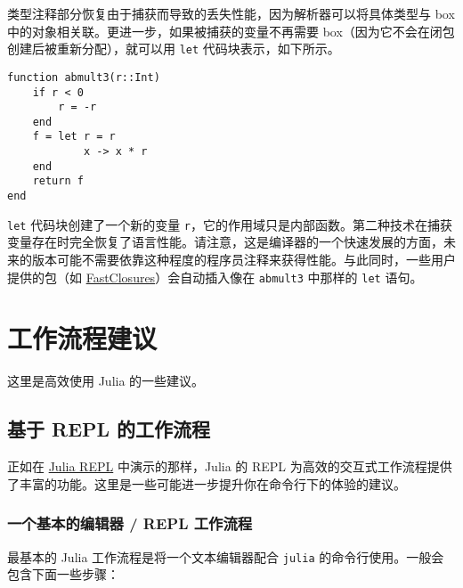 类型注释部分恢复由于捕获而导致的丢失性能，因为解析器可以将具体类型与 box 中的对象相关联。更进一步，如果被捕获的变量不再需要 box（因为它不会在闭包创建后被重新分配），就可以用 \texttt{let} 代码块表示，如下所示。




\begin{verbatim}
function abmult3(r::Int)
    if r < 0
        r = -r
    end
    f = let r = r
            x -> x * r
    end
    return f
end
\end{verbatim}



\texttt{let} 代码块创建了一个新的变量 \texttt{r}，它的作用域只是内部函数。第二种技术在捕获变量存在时完全恢复了语言性能。请注意，这是编译器的一个快速发展的方面，未来的版本可能不需要依靠这种程度的程序员注释来获得性能。与此同时，一些用户提供的包（如 \href{https://github.com/c42f/FastClosures.jl}{FastClosures}）会自动插入像在 \texttt{abmult3} 中那样的 \texttt{let} 语句。



\hypertarget{14117620934191882930}{}


\chapter{工作流程建议}



这里是高效使用 Julia 的一些建议。



\hypertarget{1742408234615272902}{}


\section{基于 REPL 的工作流程}



正如在 \hyperlink{10670790884919535588}{Julia REPL} 中演示的那样，Julia 的 REPL 为高效的交互式工作流程提供了丰富的功能。这里是一些可能进一步提升你在命令行下的体验的建议。



\hypertarget{11122328157249839079}{}


\subsection{一个基本的编辑器 / REPL 工作流程}



最基本的 Julia 工作流程是将一个文本编辑器配合 \texttt{julia} 的命令行使用。一般会包含下面一些步骤：




